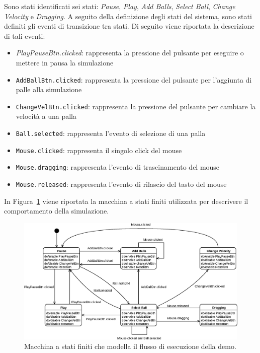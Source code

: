 Sono stati identificati sei stati: \textit{Pause}, \textit{Play}, \textit{Add Balls}, \textit{Select Ball},
\textit{Change Velocity} e \textit{Dragging}.
A seguito della definizione degli stati del sistema, sono stati definiti gli eventi di transizione tra stati.
Di seguito viene riportata la descrizione di tali eventi:
\begin{itemize}
    \item \textit{PlayPauseBtn.clicked}: rappresenta la pressione del pulsante per eseguire o mettere in pausa la
    simulazione
    \item \texttt{AddBallBtn.clicked}: rappresenta la pressione del pulsante per l'aggiunta di palle alla simulazione
    \item \texttt{ChangeVelBtn.clicked}: rappresenta la pressione del pulsante per cambiare la velocità a una palla
    \item \texttt{Ball.selected}: rappresenta l'evento di selezione di una palla
    \item \texttt{Mouse.clicked}: rappresenta il singolo click del mouse
    \item \texttt{Mouse.dragging}: rappresenta l'evento di trascinamento del mouse
    \item \texttt{Mouse.released}: rappresenta l'evento di rilascio del tasto del mouse
\end{itemize}

In Figura~\ref{fig:fsm-demo} viene riportata la macchina a stati finiti utilizzata per descrivere il comportamento
della simulazione.

\begin{figure}[H]
    \centering
    \includegraphics[width=\textwidth]{img/fsm-demo}
    \caption{Macchina a stati finiti che modella il flusso di esecuzione della demo.}\label{fig:fsm-demo}
\end{figure}

